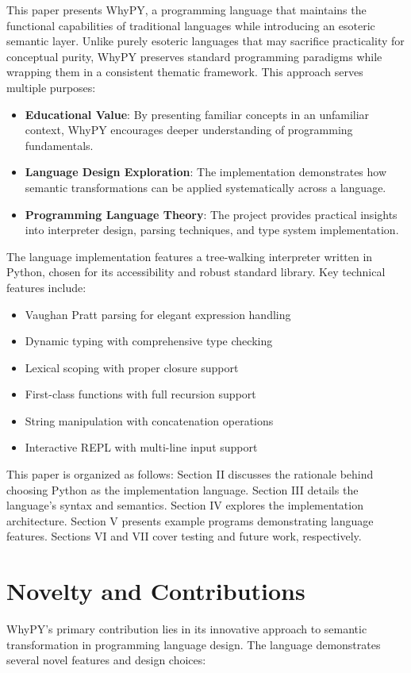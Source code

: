 \documentclass[conference]{IEEEtran}
\begin{document}
This paper presents WhyPY, a programming language that maintains the functional capabilities of traditional languages while introducing an esoteric semantic layer. Unlike purely esoteric languages that may sacrifice practicality for conceptual purity, WhyPY preserves standard programming paradigms while wrapping them in a consistent thematic framework. This approach serves multiple purposes:

\begin{itemize}
    \item \textbf{Educational Value}: By presenting familiar concepts in an unfamiliar context, WhyPY encourages deeper understanding of programming fundamentals.
    \item \textbf{Language Design Exploration}: The implementation demonstrates how semantic transformations can be applied systematically across a language.
    \item \textbf{Programming Language Theory}: The project provides practical insights into interpreter design, parsing techniques, and type system implementation.
\end{itemize}

The language implementation features a tree-walking interpreter written in Python, chosen for its accessibility and robust standard library. Key technical features include:
\begin{itemize}
    \item Vaughan Pratt parsing for elegant expression handling
    \item Dynamic typing with comprehensive type checking
    \item Lexical scoping with proper closure support
    \item First-class functions with full recursion support
    \item String manipulation with concatenation operations
    \item Interactive REPL with multi-line input support
\end{itemize}

This paper is organized as follows: Section II discusses the rationale behind choosing Python as the implementation language. Section III details the language's syntax and semantics. Section IV explores the implementation architecture. Section V presents example programs demonstrating language features. Sections VI and VII cover testing and future work, respectively.



\section{Novelty and Contributions}
WhyPY's primary contribution lies in its innovative approach to semantic transformation in programming language design. The language demonstrates several novel features and design choices:
\end{document}
